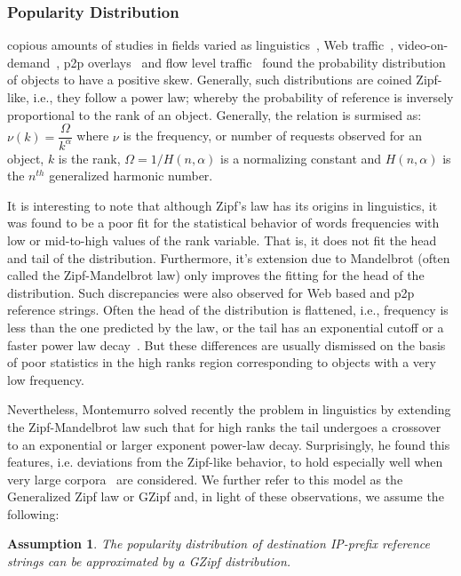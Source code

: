 \documentclass[twocolumn, 10pt]{article}
\theoremstyle{plain}
\newtheorem{assumption}{Assumption}
\begin{document}
\subsubsection{Popularity Distribution} copious amounts of studies in fields
varied as linguistics~\cite{zipf:principle_least_effort, montemurro:gzipf},
Web traffic~\cite{breslau:web_and_zipf,mahanti:web_proxy_hierarchy},
video-on-demand~\cite{cha:itube}, p2p overlays~\cite{dan:plaw} and flow level
traffic~\cite{sarrar:leverage_zipf} found the probability distribution of
objects to have a positive skew. Generally, such distributions are coined
Zipf-like, i.e., they follow a power law; whereby the probability
of reference is inversely proportional to the rank of an object. Generally,
the relation is surmised as: $\nu(k) = \dfrac{\Omega}{k^\alpha}$
\noindent where $\nu$ is the frequency, or number of requests observed for an
object, $k$ is the rank, $\Omega=1/H(n,\alpha)$ is a normalizing constant and
$H(n,\alpha)$ is the $n^{th}$ generalized harmonic number. 

It is interesting to note that although Zipf's law has its origins in
linguistics, it was found to be a poor fit for the statistical behavior of
words frequencies with low or mid-to-high values of the rank variable. That
is, it does not fit the head and tail of the distribution.
Furthermore, it's extension due to Mandelbrot (often called the
Zipf-Mandelbrot law) only improves the fitting for the head of the
distribution.
Such discrepancies were also observed for Web based and p2p reference strings.
Often the head of the distribution is flattened, i.e., frequency is less than the
one predicted by the law, or the tail has an exponential cutoff or a faster
power law decay~\cite{montemurro:gzipf, dan:plaw}. But these differences are usually 
dismissed on the basis of poor statistics in the high ranks region
corresponding to objects with a very low frequency. 

Nevertheless, Montemurro solved recently the problem in linguistics by
extending the Zipf-Mandelbrot law such that for high ranks the tail
undergoes a crossover to an exponential or larger exponent power-law decay.
Surprisingly, he found this features, i.e. deviations from the Zipf-like
behavior, to hold especially well when very large
corpora~\cite{montemurro:gzipf} are considered. We further refer to this model
as the Generalized Zipf law or GZipf and, in light of these observations, we
assume the following: 


\begin{assumption}\label{prop:gzipf}
    The popularity distribution of destination IP-prefix reference strings can be
    approximated by a GZipf distribution.
\end{assumption}
\end{document}
